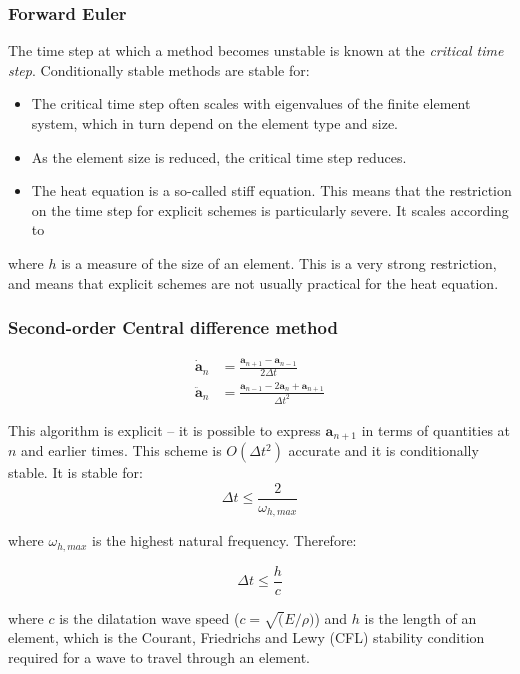 \documentclass[notes]{beamer}
\begin{document}
\begin{frame}
\frametitle{Forward Euler}
The time step at which a method becomes unstable is known at the \textit{critical time
step}. Conditionally stable methods are stable for: 

\begin{itemize}
	\item The critical time step often scales with eigenvalues of the finite element system, which in turn depend on the element type and size. 
	\item As the element size is reduced, the critical time step reduces.
	\item The heat equation is a so-called stiff equation. This means that the restriction on the
	time step for explicit schemes is particularly severe. It scales according to \mode<beamer>{$\Delta t \propto h^2$}
\end{itemize}
where $h$ is a measure of the size of an element. This is a very strong restriction, and
means that explicit schemes are not usually practical for the heat equation.
\end{frame}


\begin{frame}
\frametitle{Second-order Central difference method}
\begin{align*}
	\dot{\mathbf{a}}_n & = \frac{\mathbf{a}_{n+1} - \mathbf{a}_{n-1} }{2\Delta t} \\
	\ddot{\mathbf{a}}_n & = \frac{\mathbf{a}_{n-1} -2 \mathbf{a}_n + \mathbf{a}_{n+1} }{\Delta t^2}
\end{align*}
	
This algorithm is explicit – it is possible	to express $\mathbf{a}_{n+1}$ in terms of quantities at $n$ and earlier times. This scheme is $O(\Delta t^2)$ 	accurate and it is conditionally stable. It is stable for:
	\begin{equation*}
	\Delta t \le \frac{2}{\omega_{h, max}}
	\end{equation*}
	
	where $\omega_{h, max}$ is the highest natural frequency. Therefore:
	
	\begin{equation*}
	\Delta t \le \frac{h}{c}
	\end{equation*}

where $c$ is the dilatation wave speed ($c = \sqrt(E/\rho)$) and $h$ is the length of an element, which is the Courant, Friedrichs and Lewy (CFL) stability condition required for a wave to travel through an element.
\end{frame}
\end{document}

